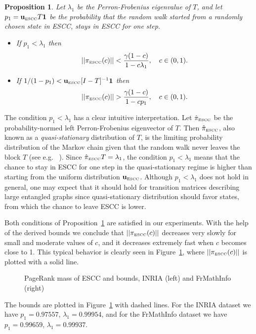 \documentclass{article}
\newtheorem{proposition}{Proposition}
\newcommand{\escc}{{\mbox{\tiny ESCC}}}
\newcommand{\onesccn}{{\bf 1}}
\def\ue{{{\bf u}_{\mbox{\tiny ESCC}}}}
\begin{document}
\begin{proposition}
\label{prop:bounds}
Let $\lambda_1$ be the Perron-Frobenius eigenvalue of $T$, and let
$p_1=\ue T\onesccn$
be the probability that the random walk started from a randomly chosen state in ESCC, stays in ESCC for one step.
\begin{itemize}
\item[(i)]
If $p_1<\lambda_1$ then
\begin{equation}
\label{ub} ||\pi_\escc(c)||<\frac{\gamma(1-c)}{1-c\lambda_1},\quad
c\in(0,1).\end{equation} \item[(ii)] If
$1/(1-p_1)<\ue[I-T]^{-1}\onesccn$ then
\begin{equation}
\label{lb} ||\pi_\escc(c)||>\frac{\gamma(1-c)}{1-cp_1},\quad
c\in(0,1).\end{equation}
\end{itemize}
\end{proposition}

The condition $p_1<\lambda_1$
 has a clear intuitive interpretation. Let $\hat{\pi}_\escc$ be the probability-normed
left Perron-Frobenius eigenvector of $T$. Then $\hat{\pi}_\escc$,
also known as a {\it quasi-stationary} distribution of $T$, is the
limiting probability distribution of the Markov chain given that
the random walk never leaves the block $T$ (see e.g.
~\cite{Seneta}). Since $\hat{\pi}_\escc T=\lambda_1$, the
condition $p_1<\lambda_1$ means that the chance to stay in ESCC
for one step in the quasi-stationary regime is higher than
starting from the uniform distribution $\ue$. Although
$p_1<\lambda_1$ does not hold in general, one may expect that it
should hold for transition matrices describing large entangled
graphs since quasi-stationary distribution should favor states,
from which the chance to leave ESCC is lower.


Both conditions of Proposition~\ref{prop:bounds} are satisfied in
our experiments. With the help of the derived bounds we conclude
that $||\pi_\escc(c)||$  decreases very slowly for small and
moderate values of $c$, and it decreases extremely fast when $c$
becomes close to 1. This typical behavior is clearly seen in
Figure~\ref{fig:escc}, where $||\pi_\escc(c)||$ is plotted with a
solid line.
\begin{figure}[hbt]
{\epsfxsize=2in }
                \caption{\small PageRank mass of ESCC and bounds, INRIA (left) and FrMathInfo (right)}
\label{fig:escc}
\end{figure}
The bounds are plotted in Figure~\ref{fig:escc} with dashed lines.
For the INRIA dataset we have $p_1=0.97557$, $\lambda_1=0.99954$,
and for the FrMathInfo dataset we have $p_1=0.99659$,
$\lambda_1=0.99937$.
\end{document}
